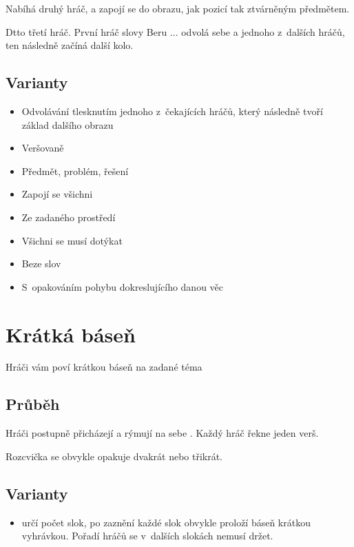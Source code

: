 Nabíhá druhý hráč, a zapojí se do obrazu, jak pozicí tak ztvárněným předmětem.  
 
Dtto třetí hráč. 
První hráč slovy Beru ... odvolá sebe a jednoho z~dalších hráčů, ten následně začíná další kolo. 
\subsection{Varianty} \begin{itemize}
\item Odvolávání tlesknutím jednoho z~čekajících hráčů, který následně tvoří základ dalšího obrazu
\item Veršovaně
\item Předmět, problém, řešení
\item Zapojí se všichni
\item Ze zadaného prostředí
\item Všichni se musí dotýkat
\item Beze slov
\item S~opakováním  pohybu dokreslujícího danou věc
\end{itemize}
 
 
 
 
 
 
\needspace{5cm} \section{Krátká báseň} \label{krátká báseň}  
 
 
Hráči vám poví krátkou báseň na zadané téma 
 
 
\subsection{ Průběh } Hráči postupně přicházejí a rýmují na sebe . 
Každý hráč řekne jeden verš.  
 
Rozcvička se obvykle opakuje dvakrát nebo třikrát. 
\subsection{ Varianty } \begin{itemize}
\item  {} určí počet slok, po zaznění každé slok obvykle  proloží báseň krátkou vyhrávkou. Pořadí hráčů se v~dalších slokách nemusí držet.
\end{itemize}
 
